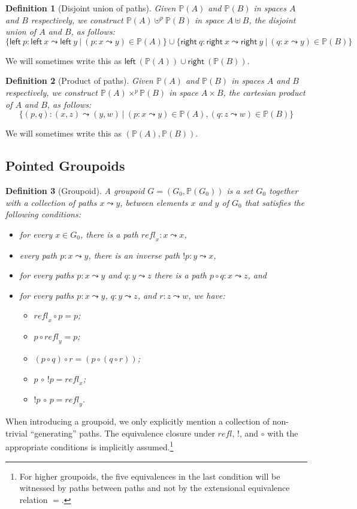 \documentclass[11pt]{article}
\newcommand{\union}{\cup}
\newtheorem{definition}{Definition}
\newcommand{\refl}{\mathit{refl}}
\renewcommand{\path}{\leadsto}
\newcommand{\paths}[1]{\mathds{P}(#1)}
\newcommand{\leftv}[1]{\textsf{left}~#1}
\newcommand{\rightv}[1]{\textsf{right}~#1}
\begin{document}
\begin{definition}[Disjoint union of paths]
Given $\paths{A}$ and $\paths{B}$ in spaces $A$ and $B$ respectively, we
construct $\paths{A} \uplus^p \paths{B}$ in space $A \uplus B$, the disjoint
union of $A$ and $B$, as follows:
\[ 
  \{ \leftv{p} : \leftv{x} \path \leftv{y} ~|~ 
    (p : x \path y) \in \paths{A} \}
  \union
  \{ \rightv{q} : \rightv{x} \path \rightv{y} ~|~ 
    (q : x \path y) \in \paths{B} \}
\]
\end{definition}
We will sometimes write this as $\leftv{(\paths{A})} \union
\rightv{(\paths{B})}$.

\begin{definition}[Product of paths]
Given $\paths{A}$ and $\paths{B}$ in spaces $A$ and $B$
respectively, we construct $\paths{A} \times^p \paths{B}$ in
space $A \times B$, the cartesian product of $A$ and $B$, as follows: 
\[ 
\{ (p,q) : (x,z) \path (y,w) ~|~ (p : x \path y) \in \paths{A}, 
   (q : z \path w) \in \paths{B} \}
\]
\end{definition}
We will sometimes write this as $(\paths{A},\paths{B})$.

\subsection{Pointed Groupoids} 

\begin{definition}[Groupoid]
A \emph{groupoid} $G = (G_0, \paths{G_0})$ is a set $G_0$ together
with a collection of paths $x \path y$, between elements $x$ and $y$ of $G_0$
that satisfies the following conditions:
\begin{itemize}
\item for every $x \in G_0$, there is a path $\refl_x : x \path x$,
\item every path $p : x \path y$, there is an inverse path $! p : y \path x$, 
\item for every paths $p : x \path y$ and $q : y \path z$ there is a path $p
  \circ q : x \path z$, and
\item for every paths $p : x \path y$, $q : y \path z$, and $r : z \path w$,
  we have:
  \begin{itemize}
  \item $\refl_x \circ p = p$;
  \item $p \circ \refl_y = p$;
  \item $(p \circ q) \circ r = (p \circ (q \circ r))$;
  \item $p \,\circ\, !p = \refl_x$;
  \item $!p \,\circ\, p = \refl_y$.
  \end{itemize}
\end{itemize}
\end{definition}
When introducing a groupoid, we only explicitly mention a collection of
non-trivial ``generating'' paths. The equivalence closure under $\refl$, $!$,
and $\circ$ with the appropriate conditions is implicitly
assumed.\footnote{For higher groupoids, the five equivalences in the last
  condition will be witnessed by paths between paths and not by the
  extensional equivalence relation $=$.}
\end{document}
